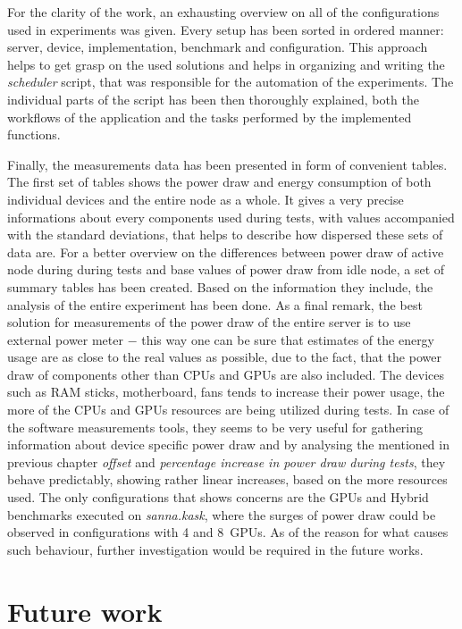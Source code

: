 For the clarity of the work, an exhausting overview on all of the
configurations used in experiments was given. Every setup has been sorted
in ordered manner: server, device, implementation, benchmark and configuration.
This approach helps to get grasp on the used solutions and helps in organizing
and writing the \emph{scheduler} script, that was responsible for the
automation of the experiments. The individual parts of the script has been
then thoroughly explained, both the workflows of the application and the
tasks performed by the implemented functions.

Finally, the measurements data has been presented in form of convenient tables.
The first set of tables shows the power draw and energy consumption of both
individual devices and the entire node as a whole. It gives a very precise
informations about every components used during tests, with values accompanied
with the standard deviations, that helps to describe how dispersed these sets
of data are. For a better overview on the differences between power draw
of active node during during tests and base values of power draw from idle
node, a set of summary tables has been created. Based on the information
they include, the analysis of the entire experiment has been done.
As a final remark, the best solution for measurements of the power draw of the
entire server is to use external power meter $-$ this way one can be sure that
estimates of the energy usage are as close to the real values as possible, due
to the fact, that the power draw of components other than CPUs and GPUs are
also included. The devices such as RAM sticks, motherboard, fans tends to
increase their power usage, the more of the CPUs and GPUs resources are being
utilized during tests. In case of the software measurements tools, they seems
to be very useful for gathering information about device specific power draw
and by analysing the mentioned in previous chapter \emph{offset} and
\emph{percentage increase in power draw during tests}, they behave predictably,
showing rather linear increases, based on the more resources used. The only
configurations that shows concerns are the GPUs and Hybrid benchmarks
executed on \emph{sanna.kask}, where the surges of power draw could be
observed in configurations with 4 and 8~GPUs. As of the reason for what 
causes such behaviour, further investigation would be required in the
future works.



\section{Future work}

